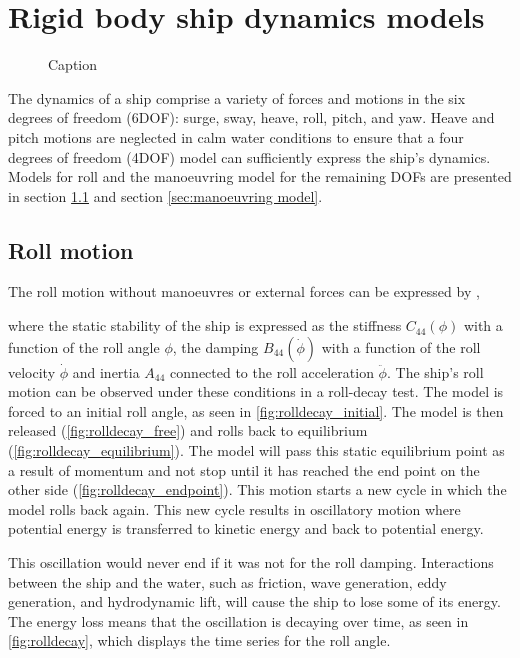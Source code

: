 \chapter{Rigid body ship dynamics models}
\label{ch:models}
\begin{figure}
    \centering
    
    \caption{Caption}
    \label{fig:enter-label}
\end{figure}


The dynamics of a ship comprise a variety of forces and motions in the six degrees of freedom (6DOF): surge, sway, heave, roll, pitch, and yaw. Heave and pitch motions are neglected in calm water conditions to ensure that a four degrees of freedom (4DOF) model can sufficiently express the ship's dynamics. Models for roll and the manoeuvring model for the remaining DOFs are presented in section \ref{sec:roll} and section \ref{sec:manoeuvring model}. 

\section{Roll motion} \label{sec:roll}
The roll motion without manoeuvres or external forces can be expressed by  \cite{himeno_prediction_1981},

\noindent where the static stability of the ship is expressed as the stiffness $C_{44}(\phi)$ with a function of the roll angle $\phi$, the damping $B_{44}(\dot{\phi})$ with a function of the roll velocity $\dot{\phi}$ and inertia $A_{44}$ connected to the roll acceleration $\ddot{\phi}$. The ship's roll motion can be observed under these conditions in a roll-decay test. The model is forced to an initial roll angle, as seen in \autoref{fig:rolldecay_initial}. The model is then released (\autoref{fig:rolldecay_free}) and rolls back to equilibrium (\autoref{fig:rolldecay_equilibrium}). The model will pass this static equilibrium point as a result of momentum and not stop until it has reached the end point on the other side (\autoref{fig:rolldecay_endpoint}). This motion starts a new cycle in which the model rolls back again. This new cycle results in oscillatory motion where potential energy is transferred to kinetic energy and back to potential energy.

\noindent This oscillation would never end if it was not for the roll damping. Interactions between the ship and the water, such as friction, wave generation, eddy generation, and hydrodynamic lift, will cause the ship to lose some of its energy. The energy loss means that the oscillation is decaying over time, as seen in \autoref{fig:rolldecay}, which displays the time series for the roll angle.

